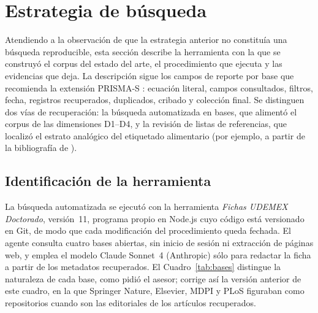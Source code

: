 \documentclass[letter,12pt]{article}
\begin{document}
\section{Estrategia de búsqueda}\label{sec:busqueda}

Atendiendo a la observación de que la estrategia anterior no constituía una búsqueda reproducible, esta sección describe la herramienta con la que se construyó el corpus del estado del arte, el procedimiento que ejecuta y las evidencias que deja. La descripción sigue los campos de reporte por base que recomienda la extensión PRISMA-S \citep{rethlefsen2021}: ecuación literal, campos consultados, filtros, fecha, registros recuperados, duplicados, cribado y colección final. Se distinguen dos vías de recuperación: la búsqueda automatizada en bases, que alimentó el corpus de las dimensiones D1--D4, y la revisión de listas de referencias, que localizó el estrato analógico del etiquetado alimentario (por ejemplo, \citet{reyes2019desarrollo} a partir de la bibliografía de \citet{jauregui2020intenciones}).

\subsection{Identificación de la herramienta}

La búsqueda automatizada se ejecutó con la herramienta \textit{Fichas UDEMEX Doctorado}, versión~11, programa propio en Node.js cuyo código está versionado en Git, de modo que cada modificación del procedimiento queda fechada. El agente consulta cuatro bases abiertas, sin inicio de sesión ni extracción de páginas web, y emplea el modelo Claude Sonnet~4 (Anthropic) sólo para redactar la ficha a partir de los metadatos recuperados. El Cuadro~\ref{tab:bases} distingue la naturaleza de cada base, como pidió el asesor; corrige así la versión anterior de este cuadro, en la que Springer Nature, Elsevier, MDPI y PLoS figuraban como repositorios cuando son las editoriales de los artículos recuperados.
\end{document}
